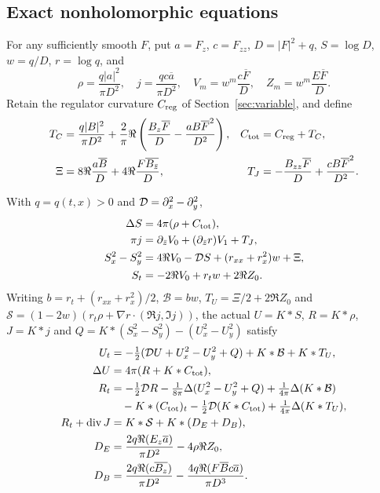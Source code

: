 \subsection{Exact nonholomorphic equations}
For any sufficiently smooth $F$, put $a=F_z$, $c=F_{zz}$,
$D=|F|^2+q$, $S=\log D$, $w=q/D$, $r=\log q$, and
\[
 \rho=\frac{q|a|^2}{\pi D^2},\quad
 j=\frac{qc\overline a}{\pi D^2},\quad
 V_m=w^m\frac{c\overline F}{D},\quad
 Z_m=w^m\frac{E\overline F}{D}.
\]
Retain the regulator curvature $C_{\rm reg}$ of
Section~\ref{sec:variable}, and define
\begin{align}
 T_C&=\frac{q|B|^2}{\pi D^2}
   +\frac2\pi\Re\left(\frac{B_z\overline F}{D}
                  -\frac{aB\overline F^2}{D^2}\right),
 &C_{\rm tot}&=C_{\rm reg}+T_C,\notag\\
 \Xi&=8\Re\frac{a\overline B}{D}
       +4\Re\frac{F\overline{B_{\bar z}}}{D},&
 T_J&=-\frac{B_{zz}\overline F}{D}
                  +\frac{cB\overline F^2}{D^2}.
 \label{eq:sj-corrections}
\end{align}
\begin{proposition}\label{prop:sj-identities}
With $q=q(t,x)>0$ and $\mathcal D=\partial_x^2-\partial_y^2$,
\begin{align}
 \Delta S&=4\pi(\rho+C_{\rm tot}),\notag\\
 \pi j&=\partial_{\bar z}V_0+(\partial_{\bar z}r)V_1+T_J,\notag\\
 S_x^2-S_y^2&=4\Re V_0-\mathcal D S+(r_{xx}+r_x^2)w+\Xi,\notag\\
 S_t&=-2\Re V_0+r_tw+2\Re Z_0.
 \label{eq:sj-primitives}
\end{align}
Writing $b=r_t+(r_{xx}+r_x^2)/2$, $\mathcal B=bw$,
$T_U=\Xi/2+2\Re Z_0$ and
$\mathcal S=(1-2w)(r_t\rho+\nabla r\cdot(\Re j,\Im j))$, the actual
$U=K*S$, $R=K*\rho$, $J=K*j$ and
$Q=K*(S_x^2-S_y^2)-(U_x^2-U_y^2)$ satisfy
\begin{align}
 U_t&=-\tfrac12(\mathcal D U+U_x^2-U_y^2+Q)+K*\mathcal B+K*T_U,\notag\\
 \Delta U&=4\pi(R+K*C_{\rm tot}),\notag\\
 R_t&=-\tfrac12\mathcal D R-\tfrac1{8\pi}\Delta(U_x^2-U_y^2+Q)
       +\tfrac1{4\pi}\Delta(K*\mathcal B)\notag\\
 &\hspace{1em}-K*(C_{\rm tot})_t-\tfrac12\mathcal D(K*C_{\rm tot})
                     +\tfrac1{4\pi}\Delta(K*T_U),\notag\\
 R_t+\operatorname{div}J&=K*\mathcal S+K*(D_E+D_B),
 \label{eq:sj-equations}\\
 D_E&=\frac{2q\Re(E_z\overline a)}{\pi D^2}-4\rho\Re Z_0,\notag\\
 D_B&=\frac{2q\Re(c\overline{B_z})}{\pi D^2}
             -\frac{4q\Re(F\overline Bc\overline a)}{\pi D^3}.
 \label{eq:sj-current-defects}
\end{align}
\end{proposition}
